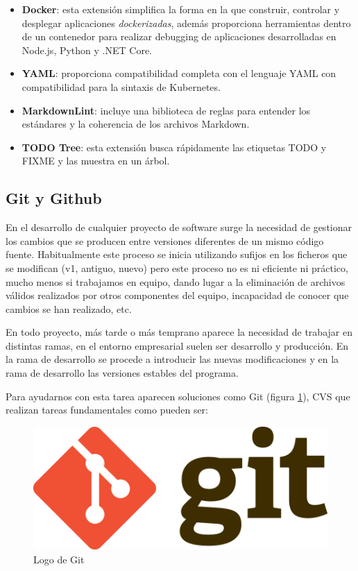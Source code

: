 \begin{itemize}
    \item \textbf{Docker}: esta extensión simplifica la forma en la que construir, controlar y desplegar aplicaciones \textit{dockerizadas}, además proporciona herramientas dentro de un contenedor para realizar debugging de aplicaciones desarrolladas en Node.js, Python y .NET Core.
    \item \textbf{YAML}: proporciona compatibilidad completa con el lenguaje YAML con compatibilidad para la sintaxis de Kubernetes.
    \item \textbf{MarkdownLint}: incluye una biblioteca de reglas para entender los estándares y la coherencia de los archivos Markdown. 
    \item \textbf{TODO Tree}: esta extensión busca rápidamente las etiquetas TODO y FIXME y las muestra en un árbol. 
\end{itemize}


\subsection{Git y Github}

En el desarrollo de cualquier proyecto de software surge la necesidad de gestionar los cambios que se producen entre versiones diferentes de un mismo código fuente. Habitualmente este proceso se inicia utilizando sufijos en los ficheros que se modifican (v1, antiguo, nuevo) pero este proceso no es ni eficiente ni práctico, mucho menos si trabajamos en equipo, dando lugar a la eliminación de archivos válidos realizados por otros componentes del equipo, incapacidad de conocer que cambios se han realizado, etc.

En todo proyecto, más tarde o más temprano aparece la necesidad de trabajar en distintas ramas, en el entorno empresarial suelen ser desarrollo y producción. En la rama de desarrollo se procede a introducir las nuevas modificaciones y en la rama de desarrollo las versiones estables del programa.

Para ayudarnos con esta tarea aparecen soluciones como Git (figura \ref{fig:git}), CVS que realizan tareas fundamentales como pueden ser:

\begin{figure}[H]
    \centering
    \includegraphics[scale=0.1]{include/figuras/Git.png}
    \caption{Logo de Git}
    \label{fig:git}
\end{figure}

